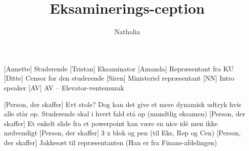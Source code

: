 \documentclass[a4paper,11pt]{article}
\title{Eksaminerings-ception}
\author{Nathalia}
\begin{document}
\maketitle

\begin{roles}
    [Annette] Studerende
    [Tristan] Eksaminator
    [Amanda] Repræsentant fra KU
    [Ditte] Censor for den studerende
    [Siren] Ministeriel repræsentant
    [NN] Intro speaker
    [AV] AV -- Elevator-ventemuzak
\end{roles}

\begin{props}
    [Person, der skaffer] Evt stole? Dog kan det give et mere dynamisk udtryk hvis alle står op. Studerende skal i hvert fald stå op (mundtlig eksamen)
    [Person, der skaffer] Et enkelt slide fra et powerpoint kan være en nice idé men ikke nødvendigt
    [Person, der skaffer] 3 x blok og pen (til Eks, Rep og Cen)
    [Person, der skaffer] Jakkesæt til repræsentanten (Han er fra Finans-afdelingen)
\end{props}
\end{document}
